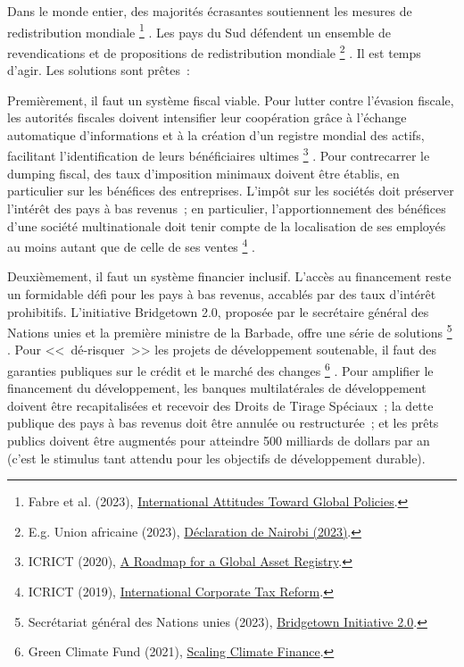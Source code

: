 \documentclass[a5paper,french,openany]{memoir}
\begin{document}
Dans le monde entier, des majorités écrasantes soutiennent les mesures de redistribution mondiale
\footnote{Fabre et al. (2023), \href{https://papers.ssrn.com/sol3/papers.cfm?abstract\_id=4448523}{International Attitudes Toward Global Policies}.}%
. Les pays du Sud défendent un ensemble de revendications et de propositions de redistribution mondiale
\footnote{E.g. Union africaine (2023), \href{https://media.africaclimatesummit.org/NAIROBI+Declaration+FURTHER+edited+060923+EN+920AM.pdf}{Déclaration de Nairobi (2023)}.}%
. Il est temps d'agir. Les solutions sont prêtes~:

Premièrement, il faut un système fiscal viable. Pour lutter contre l'évasion fiscale, les autorités fiscales doivent intensifier leur coopération grâce à l'échange automatique d'informations et à la création d'un registre mondial des actifs, facilitant l'identification de leurs bénéficiaires ultimes
\footnote{ICRICT (2020), \href{https://static1.squarespace.com/static/5a0c602bf43b5594845abb81/t/5c988368eef1a1538c2ae7eb/1553498989927/GAR.pdf}{A Roadmap for a Global Asset Registry}.}%
. Pour contrecarrer le dumping fiscal, des taux d'imposition minimaux doivent être établis, en particulier sur les bénéfices des entreprises. L'impôt sur les sociétés doit préserver l'intérêt des pays à bas revenus~; en particulier, l'apportionnement des bénéfices d'une société multinationale doit tenir compte de la localisation de ses employés au moins autant que de celle de ses ventes
\footnote{ICRICT (2019), \href{https://static1.squarespace.com/static/5a0c602bf43b5594845abb81/t/5d979e6dc5f7cb7b66842c49/1570217588721/ICRICT-INTERNATIONAL+CORPORATE+TAX+REFORM.pdf}{International Corporate Tax Reform}.}%
. 

Deuxièmement, il faut un système financier inclusif. L'accès au financement reste un formidable défi pour les pays à bas revenus, accablés par des taux d'intérêt prohibitifs. L'initiative Bridgetown 2.0, proposée par le secrétaire général des Nations unies et la première ministre de la Barbade, offre une série de solutions
\footnote{Secrétariat général des Nations unies (2023), \href{https://www.un.org/sustainabledevelopment/blog/2023/04/press-release-with-clock-ticking-for-the-sdgs-un-chief-and-barbados-prime-minister-call-for-urgent-action-to-transform-broken-global-financial-system/}{Bridgetown Initiative 2.0}.}%
. Pour <<~dé-risquer~>> les projets de développement soutenable, il faut des garanties publiques sur le crédit et le marché des changes
\footnote{Green Climate Fund (2021), \href{https://www.greenclimate.fund/sites/default/files/document/scaling-climate-finance-context-covid-19-full-report\_0.pdf}{Scaling Climate Finance}.}%
. Pour amplifier le financement du développement, les banques multilatérales de développement doivent être recapitalisées et recevoir des Droits de Tirage Spéciaux~; la dette publique des pays à bas revenus doit être annulée ou restructurée~; %
et les prêts publics doivent être augmentés pour atteindre 500 milliards de dollars par an (c'est le stimulus tant attendu pour les objectifs de développement durable). 
\end{document}

